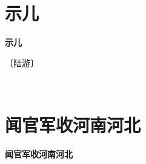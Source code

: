 \documentclass[12pt,UTF-8,openany,fontset=none]{ctexbook}
\begin{document}
\vspace{8pt}
\clearpage


\section{示儿}



\begin{center}
    {\bfseries 示儿}
\end{center}

\begin{center}
    \vspace{10pt}
    
    \begin{large}
        
        〔陆游〕
        
    \end{large}
    
    \vspace{8pt}
    
    \begin{huge}
        
        \phantom{。}

        \phantom{。}~~
        
        \phantom{。}

        \phantom{。}
        
    \end{huge}
    
\end{center}

\vspace{8pt}
\clearpage


\section{闻官军收河南河北}



\begin{center}
    {\bfseries 闻官军收河南河北}
\end{center}
\end{document}
